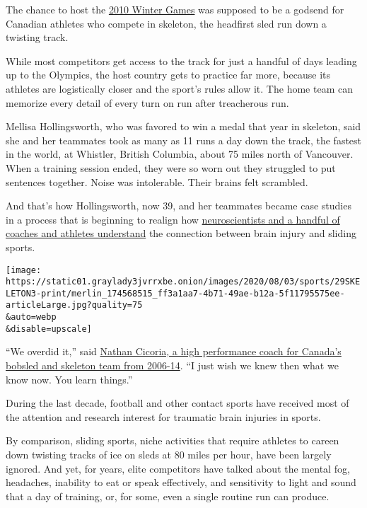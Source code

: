 The chance to host the
\href{https://www.nytimes3xbfgragh.onion/2010/02/10/sports/olympics/10podium.html}{2010
Winter Games} was supposed to be a godsend for Canadian athletes who
compete in skeleton, the headfirst sled run down a twisting track.

While most competitors get access to the track for just a handful of
days leading up to the Olympics, the host country gets to practice far
more, because its athletes are logistically closer and the sport's rules
allow it. The home team can memorize every detail of every turn on run
after treacherous run.

Mellisa Hollingsworth, who was favored to win a medal that year in
skeleton, said she and her teammates took as many as 11 runs a day down
the track, the fastest in the world, at Whistler, British Columbia,
about 75 miles north of Vancouver. When a training session ended, they
were so worn out they struggled to put sentences together. Noise was
intolerable. Their brains felt scrambled.

And that's how Hollingsworth, now 39, and her teammates became case
studies in a process that is beginning to realign how
\href{https://www.ncbi.nlm.nih.gov/pmc/articles/PMC6153360/}{neuroscientists
and a handful of coaches and athletes understand} the connection between
brain injury and sliding sports.

\texttt{[image: https://static01.graylady3jvrrxbe.onion/images/2020/08/03/sports/29SKELETON3-print/merlin\_174568515\_ff3a1aa7-4b71-49ae-b12a-5f11795575ee-articleLarge.jpg?quality=75\\\&auto=webp\\\&disable=upscale]}

``We overdid it,'' said
\href{https://olympic.ca/2013/08/07/how-the-cfl-is-redefining-bobsleigh-in-canada/}{Nathan
Cicoria, a high performance coach for Canada's bobsled and skeleton team
from 2006-14}. ``I just wish we knew then what we know now. You learn
things.''

During the last decade, football and other contact sports have received
most of the attention and research interest for traumatic brain injuries
in sports.

By comparison, sliding sports, niche activities that require athletes to
careen down twisting tracks of ice on sleds at 80 miles per hour, have
been largely ignored. And yet, for years, elite competitors have talked
about the mental fog, headaches, inability to eat or speak effectively,
and sensitivity to light and sound that a day of training, or, for some,
even a single routine run can produce.

